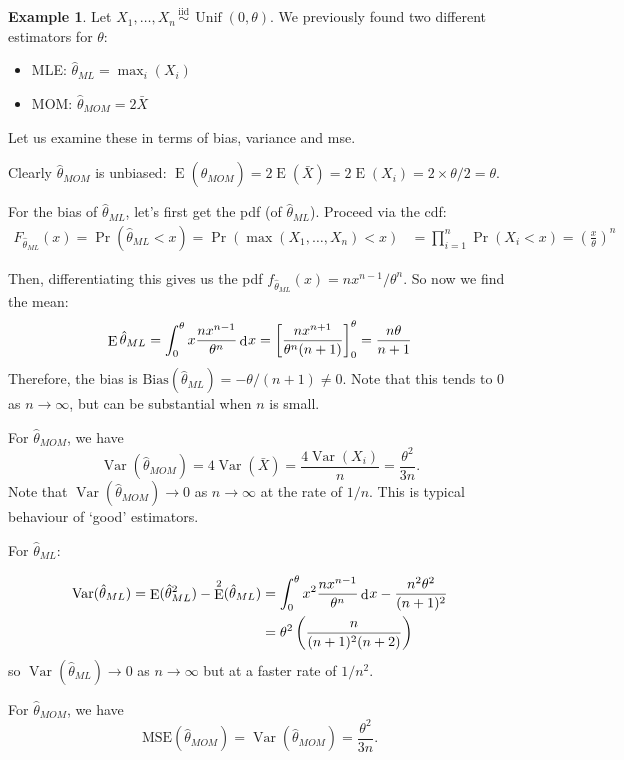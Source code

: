 \documentclass[
]{book}
\providecommand{\tightlist}{%
  \setlength{\itemsep}{0pt}\setlength{\parskip}{0pt}}
\DeclareMathOperator{\E}{E}
\DeclareMathOperator{\Var}{Var}
\DeclareMathOperator{\Unif}{Unif}
\newcommand{\iid}{\,\overset{\text{iid}}{\sim}\,}
\DeclareMathOperator{\dd}{d}
\newcommand{\dint}{\dd\hspace{0.5pt}\!}
\theoremstyle{definition}
\theoremstyle{definition}
\newtheorem{example}{Example}[chapter]
\theoremstyle{definition}
\theoremstyle{definition}
\theoremstyle{remark}
\begin{document}
\begin{example}
Let \(X_1,\dots,X_n\iid\Unif(0,\theta)\). We previously found two different estimators for \(\theta\):

\begin{itemize}
\tightlist
\item
  MLE: \(\hat\theta_{ML} = \max_i(X_i)\)
\item
  MOM: \(\hat\theta_{MOM} = 2\bar X\)
\end{itemize}

Let us examine these in terms of bias, variance and mse.

Clearly \(\hat\theta_{MOM}\) is unbiased:
\(\E(\hat\theta_{MOM}) = 2\E(\bar X) = 2\E(X_i) = 2\times \theta/2 = \theta\).

For the bias of \(\hat\theta_{ML}\), let's first get the pdf (of \(\hat\theta_{ML}\)). Proceed via the cdf:
\begin{align*}
F_{\hat\theta_{ML}}(x) = \Pr(\hat\theta_{ML} < x) = \Pr(\max(X_1,\dots,X_n) < x) &= \prod_{i=1}^n \Pr(X_i<x) 
= \left(\frac{x}{\theta}\right)^n 
\end{align*}

Then, differentiating this gives us the pdf \(f_{\hat\theta_{ML}}(x) = nx^{n-1}/\theta^n\).
So now we find the mean:
\[
\E \hat\theta_{ML} = \int_0^\theta x \frac{nx^{n-1}}{\theta^n}\dint x =\left[\frac{nx^{n+1}}{\theta^n(n+1)} \right]_0^\theta = \frac{n\theta}{n+1}
\]
Therefore, the bias is \(\text{Bias}(\hat\theta_{ML})=-\theta/(n+1)\neq 0\). Note that this tends to 0 as \(n\to\infty\), but can be substantial when \(n\) is small.

For \(\hat\theta_{MOM}\), we have
\[
\Var(\hat\theta_{MOM}) = 4\Var(\bar X) = \frac{4\Var(X_i)}{n} = \frac{\theta^2}{3n}.
\]
Note that \(\Var(\hat\theta_{MOM})\to 0\) as \(n\to\infty\) at the rate of \(1/n\). This is typical behaviour of `good' estimators.

For \(\hat\theta_{ML}\):

\begin{align*}
\Var(\hat\theta_{ML})
= \E(\hat\theta_{ML}^2) - \E^2(\hat\theta_{ML}) 
&= \int_0^\theta x^2 \frac{nx^{n-1}}{\theta^n}\dint x - \frac{n^2\theta^2}{(n+1)^2} \\
&= \theta^2 \left(\frac{n}{(n+1)^2(n+2)} \right)
\end{align*}
so \(\Var(\hat\theta_{ML})\to 0\) as \(n\to\infty\) but at a faster rate of \(1/n^2\).

For \(\hat\theta_{MOM}\), we have
\[
\text{MSE}(\hat\theta_{MOM}) = \Var(\hat\theta_{MOM}) = \frac{\theta^2}{3n}.
\]


\end{example}
\end{document}
